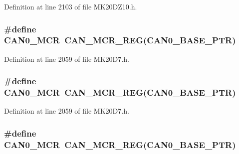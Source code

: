 Definition at line 2103 of file M\+K20\+D\+Z10.\+h.

\subsubsection[{\texorpdfstring{C\+A\+N0\+\_\+\+M\+CR}{CAN0_MCR}}]{\setlength{\rightskip}{0pt plus 5cm}\#define C\+A\+N0\+\_\+\+M\+CR~{\bf C\+A\+N\+\_\+\+M\+C\+R\+\_\+\+R\+EG}({\bf C\+A\+N0\+\_\+\+B\+A\+S\+E\+\_\+\+P\+TR})}\hypertarget{group___c_a_n___register___accessor___macros_ga300565478bb512e7ca03af0ecf31137a}{}\label{group___c_a_n___register___accessor___macros_ga300565478bb512e7ca03af0ecf31137a}


Definition at line 2059 of file M\+K20\+D7.\+h.

\subsubsection[{\texorpdfstring{C\+A\+N0\+\_\+\+M\+CR}{CAN0_MCR}}]{\setlength{\rightskip}{0pt plus 5cm}\#define C\+A\+N0\+\_\+\+M\+CR~{\bf C\+A\+N\+\_\+\+M\+C\+R\+\_\+\+R\+EG}({\bf C\+A\+N0\+\_\+\+B\+A\+S\+E\+\_\+\+P\+TR})}\hypertarget{group___c_a_n___register___accessor___macros_ga300565478bb512e7ca03af0ecf31137a}{}\label{group___c_a_n___register___accessor___macros_ga300565478bb512e7ca03af0ecf31137a}


Definition at line 2059 of file M\+K20\+D7.\+h.

\subsubsection[{\texorpdfstring{C\+A\+N0\+\_\+\+M\+CR}{CAN0_MCR}}]{\setlength{\rightskip}{0pt plus 5cm}\#define C\+A\+N0\+\_\+\+M\+CR~{\bf C\+A\+N\+\_\+\+M\+C\+R\+\_\+\+R\+EG}({\bf C\+A\+N0\+\_\+\+B\+A\+S\+E\+\_\+\+P\+TR})}\hypertarget{group___c_a_n___register___accessor___macros_ga300565478bb512e7ca03af0ecf31137a}{}\label{group___c_a_n___register___accessor___macros_ga300565478bb512e7ca03af0ecf31137a}


